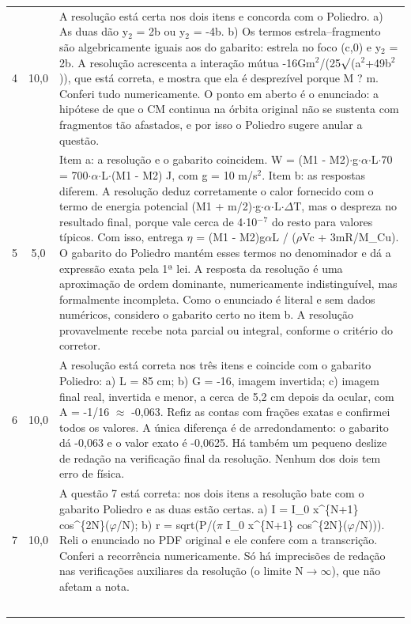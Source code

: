 \documentclass{article}%
\begin{document}
\begin{longtable}{@{}c c p{}@{}}
4 & 10,0 & A resolução está certa nos dois itens e concorda com o Poliedro. a) As duas dão y$_{2}$ = 2b ou y$_{2}$ = -4b. b) Os termos estrela--fragmento são algebricamente iguais aos do gabarito: estrela no foco (c,0) e y$_{2}$ = 2b. A resolução acrescenta a interação mútua -16Gm$^2$/(25$\surd$(a$^2$+49b$^2$)), que está correta, e mostra que ela é desprezível porque M ? m. Conferi tudo numericamente. O ponto em aberto é o enunciado: a hipótese de que o CM continua na órbita original não se sustenta com fragmentos tão afastados, e por isso o Poliedro sugere anular a questão. \\
5 & 5,0 & Item a: a resolução e o gabarito coincidem. W = (M1 - M2)$\cdot$g$\cdot$$\alpha$$\cdot$L$\cdot$70 = 700$\cdot$$\alpha$$\cdot$L$\cdot$(M1 - M2) J, com g = 10 m/s$^2$. Item b: as respostas diferem. A resolução deduz corretamente o calor fornecido com o termo de energia potencial (M1 + m/2)$\cdot$g$\cdot$$\alpha$$\cdot$L$\cdot$$\Delta$T, mas o despreza no resultado final, porque vale cerca de 4$\cdot$10$^{-}$$^{7}$ do resto para valores típicos. Com isso, entrega $\eta$ = (M1 - M2)g$\alpha$L / ($\rho$Vc + 3mR/M\_Cu). O gabarito do Poliedro mantém esses termos no denominador e dá a expressão exata pela 1ª lei. A resposta da resolução é uma aproximação de ordem dominante, numericamente indistinguível, mas formalmente incompleta. Como o enunciado é literal e sem dados numéricos, considero o gabarito certo no item b. A resolução provavelmente recebe nota parcial ou integral, conforme o critério do corretor. \\
6 & 10,0 & A resolução está correta nos três itens e coincide com o gabarito Poliedro: a) L = 85 cm; b) G = -16, imagem invertida; c) imagem final real, invertida e menor, a cerca de 5,2 cm depois da ocular, com A = -1/16 $\approx$ -0,063. Refiz as contas com frações exatas e confirmei todos os valores. A única diferença é de arredondamento: o gabarito dá -0,063 e o valor exato é -0,0625. Há também um pequeno deslize de redação na verificação final da resolução. Nenhum dos dois tem erro de física. \\
7 & 10,0 & A questão 7 está correta: nos dois itens a resolução bate com o gabarito Poliedro e as duas estão certas. a) I = I\_0 x\^{}\{N+1\} cos\^{}\{2N\}($\varphi$/N); b) r = sqrt(P/($\pi$ I\_0 x\^{}\{N+1\} cos\^{}\{2N\}($\varphi$/N))). Reli o enunciado no PDF original e ele confere com a transcrição. Conferi a recorrência numericamente. Só há imprecisões de redação nas verificações auxiliares da resolução (o limite N$\to$$\infty$), que não afetam a nota. \\
$$
\end{longtable}
\end{document}
